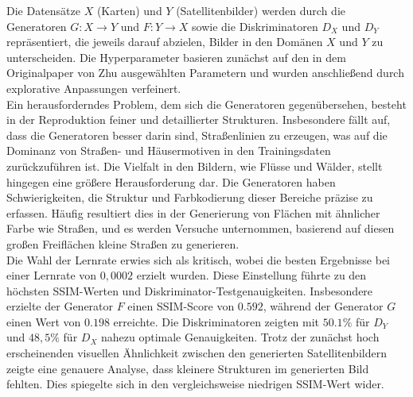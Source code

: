 Die Datensätze $X$ (Karten) und $Y$ (Satellitenbilder) werden durch die Generatoren $G: X\rightarrow Y$ und $F: Y\rightarrow X$ sowie die Diskriminatoren $D_X$ und $D_Y$ repräsentiert, die jeweils darauf abzielen, Bilder in den Domänen $X$ und $Y$ zu unterscheiden. Die Hyperparameter basieren zunächst auf den in dem Originalpaper von Zhu ausgewählten Parametern und wurden anschließend durch explorative Anpassungen verfeinert.
\\\newline
Ein herausforderndes Problem, dem sich die Generatoren gegenübersehen, besteht in der Reproduktion feiner und detaillierter Strukturen. Insbesondere fällt auf, dass die Generatoren besser darin sind, Straßenlinien zu erzeugen, was auf die Dominanz von Straßen- und Häusermotiven in den Trainingsdaten zurückzuführen ist.
Die Vielfalt in den Bildern, wie Flüsse und Wälder, stellt hingegen eine größere Herausforderung dar. Die Generatoren haben Schwierigkeiten, die Struktur und Farbkodierung dieser Bereiche präzise zu erfassen. Häufig resultiert dies in der Generierung von Flächen mit ähnlicher Farbe wie Straßen, und es werden Versuche unternommen, basierend auf diesen großen Freiflächen kleine Straßen zu generieren.
\\\newline
Die Wahl der Lernrate erwies sich als kritisch, wobei die besten Ergebnisse bei einer Lernrate von $0,0002$ erzielt wurden. Diese Einstellung führte zu den höchsten SSIM-Werten und Diskriminator-Testgenauigkeiten. Insbesondere erzielte der Generator $F$ einen SSIM-Score von $0.592$, während der Generator $G$ einen Wert von $0.198$ erreichte. Die Diskriminatoren zeigten mit $50.1\%$ für $D_Y$ und $48,5\%$ für $D_X$ nahezu optimale Genauigkeiten. Trotz der zunächst hoch erscheinenden visuellen Ähnlichkeit zwischen den generierten Satellitenbildern zeigte eine genauere Analyse, dass kleinere Strukturen im generierten Bild fehlten. Dies spiegelte sich in den vergleichsweise niedrigen SSIM-Wert wider.



